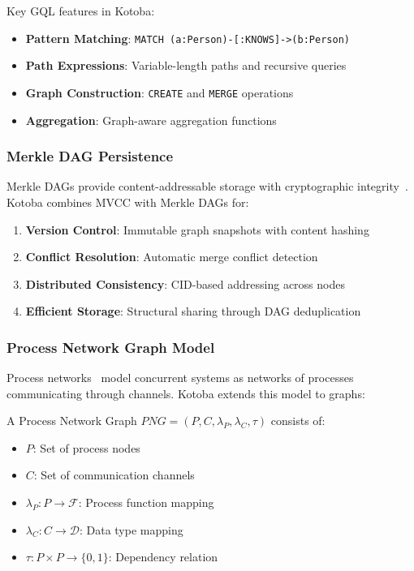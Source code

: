 \documentclass[11pt,a4paper]{article}
\begin{document}
Key GQL features in Kotoba:
\begin{itemize}
\item \textbf{Pattern Matching}: \verb|MATCH (a:Person)-[:KNOWS]->(b:Person)|
\item \textbf{Path Expressions}: Variable-length paths and recursive queries
\item \textbf{Graph Construction}: \verb|CREATE| and \verb|MERGE| operations
\item \textbf{Aggregation}: Graph-aware aggregation functions
\end{itemize}

\subsubsection{Merkle DAG Persistence}
\label{subsubsec:merkle}

Merkle DAGs provide content-addressable storage with cryptographic integrity~\cite{merkle_dag}. Kotoba combines MVCC with Merkle DAGs for:

\begin{enumerate}
\item \textbf{Version Control}: Immutable graph snapshots with content hashing
\item \textbf{Conflict Resolution}: Automatic merge conflict detection
\item \textbf{Distributed Consistency}: CID-based addressing across nodes
\item \textbf{Efficient Storage}: Structural sharing through DAG deduplication
\end{enumerate}

\subsubsection{Process Network Graph Model}
\label{subsubsec:process_network}

Process networks~\cite{kahn1974} model concurrent systems as networks of processes communicating through channels. Kotoba extends this model to graphs:

\begin{definition}
A Process Network Graph $PNG = (P, C, \lambda_P, \lambda_C, \tau)$ consists of:
\begin{itemize}
\item $P$: Set of process nodes
\item $C$: Set of communication channels
\item $\lambda_P: P \rightarrow \mathcal{F}$: Process function mapping
\item $\lambda_C: C \rightarrow \mathcal{D}$: Data type mapping
\item $\tau: P \times P \rightarrow \{0,1\}$: Dependency relation
\end{itemize}
\end{definition}
\end{document}
